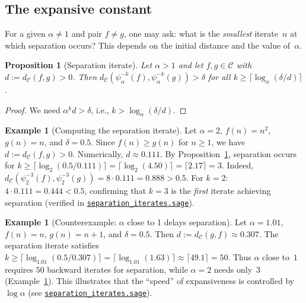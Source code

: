 \documentclass[11pt,a4paper]{article}
\newcommand{\repourl}{https://github.com/guydev42/expansive-homeomorphisms-complexity-qmetric}
\theoremstyle{plain}
\newtheorem{propositioninner}[theoreminner]{Proposition}
\theoremstyle{definition}
\newtheorem{exampleinner}[theoreminner]{Example}
\newenvironment{proposition}[1][]{\begin{propositioninner}[#1]}{\end{propositioninner}}
\newenvironment{example}[1][]{\begin{exampleinner}[#1]}{\end{exampleinner}}
\newcommand{\C}{\mathcal{C}}
\begin{document}
\subsection{The expansive constant}

For a given $\alpha\neq 1$ and pair $f\neq g$, one may ask: what is
the \emph{smallest} iterate~$n$ at which separation occurs?  This
depends on the initial distance and the value of~$\alpha$.

\begin{proposition}[Separation iterate]\label{prop:sep-iterate}
Let $\alpha>1$ and let $f,g\in\C$ with $d:=d_\C(f,g)>0$.  Then
$d_\C(\psi_\alpha^{-k}(f),\psi_\alpha^{-k}(g))>\delta$ for all
$k\ge\lceil\log_\alpha(\delta/d)\rceil$.
\end{proposition}

\begin{proof}
We need $\alpha^k d>\delta$, i.e.,
$k>\log_\alpha(\delta/d)$.
\end{proof}

\begin{example}[Computing the separation iterate]\label{ex:sep-iterate-num}
Let $\alpha=2$, $f(n)=n^2$, $g(n)=n$, and $\delta=0.5$.  Since
$f(n)\ge g(n)$ for $n\ge 1$, we have $d:=d_\C(f,g)>0$.
Numerically, $d\approx 0.111$.  By Proposition~\ref{prop:sep-iterate},
separation occurs for
$k\ge\lceil\log_2(0.5/0.111)\rceil=\lceil\log_2(4.50)\rceil
=\lceil 2.17\rceil=3$.
Indeed, $d_\C(\psi_2^{-3}(f),\psi_2^{-3}(g))=8\cdot 0.111
=0.888>0.5$.  For $k=2$: $4\cdot 0.111=0.444<0.5$, confirming
that $k=3$ is the \emph{first} iterate achieving separation
(verified in
\href{\repourl/blob/main/code/sagemath/separation_iterates.sage}{\texttt{separation\_iterates.sage}}).
\end{example}

\begin{example}[Counterexample: $\alpha$ close to 1 delays separation]\label{ex:slow-sep}
Let $\alpha=1.01$, $f(n)=n$, $g(n)=n+1$, and $\delta=0.5$.
Then $d:=d_\C(g,f)\approx 0.307$.  The separation iterate satisfies
$k\ge\lceil\log_{1.01}(0.5/0.307)\rceil=\lceil\log_{1.01}(1.63)\rceil
\approx\lceil 49.1\rceil=50$.
Thus $\alpha$ close to~$1$ requires $50$ backward iterates
for separation, while $\alpha=2$ needs only~$3$ (Example~\ref{ex:sep-iterate-num}).
This illustrates that the ``speed'' of expansiveness is controlled
by $\log\alpha$
(see \href{\repourl/blob/main/code/sagemath/separation_iterates.sage}{\texttt{separation\_iterates.sage}}).
\end{example}
\end{document}
